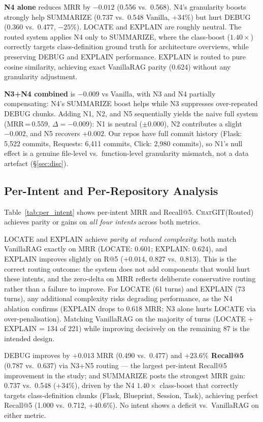 \documentclass[runningheads]{llncs}
\newcommand{\chatgit}{\textsc{ChatGIT}\xspace}
\begin{document}
\textbf{N4 alone} reduces MRR by $-0.012$ (0.556 vs.\ 0.568).
N4's granularity boosts strongly help SUMMARIZE (0.737 vs.\ 0.548 Vanilla,
$+34\%$) but hurt DEBUG (0.360 vs.\ 0.477, $-25\%$). LOCATE and
EXPLAIN are roughly neutral. The routed system applies N4 only to
SUMMARIZE, where the class-boost ($1.40\times$) correctly targets
class-definition ground truth for architecture overviews, while
preserving DEBUG and EXPLAIN performance.
EXPLAIN is routed to pure cosine similarity, achieving exact
VanillaRAG parity (0.624) without any granularity adjustment.

\textbf{N3+N4 combined} is $-0.009$ vs Vanilla, with N3 and N4
partially compensating: N4's SUMMARIZE boost helps while N3
suppresses over-repeated DEBUG chunks. Adding N1, N2,
and N5 sequentially yields the naive full system (MRR\,=\,0.559,
$\Delta{=}{-}0.009$): N1 is neutral ($\pm$0.000), N2 contributes
a slight $-0.002$, and N5 recovers $+0.002$. Our repos have full commit
history (Flask: 5,522 commits, Requests: 6,411 commits,
Click: 2,980 commits), so N1's null
effect is a genuine file-level vs.\ function-level granularity
mismatch, not a data artefact (\S\ref{sec:disc}).

\subsection{Per-Intent and Per-Repository Analysis}

Table~\ref{tab:per_intent} shows per-intent MRR and Recall@5.
\chatgit (Routed) achieves parity or gains on \emph{all four
intents} across both metrics.

LOCATE and EXPLAIN achieve \emph{parity at reduced complexity}:
both match VanillaRAG exactly on MRR (LOCATE: 0.601; EXPLAIN: 0.624),
and EXPLAIN improves slightly on R@5 ($+0.014$, 0.827 vs.\ 0.813).
This is the correct routing outcome: the system does not add
components that would hurt these intents, and the zero-delta on MRR
reflects deliberate conservative routing rather than a failure to
improve. For LOCATE (61 turns) and EXPLAIN (73 turns), any
additional complexity risks degrading performance, as the N4 ablation
confirms (EXPLAIN drops to 0.618 MRR; N3 alone hurts LOCATE via
over-penalisation). Matching VanillaRAG on the majority of turns
(LOCATE + EXPLAIN = 134 of 221) while improving decisively on the
remaining 87 is the intended design.

DEBUG improves by $+0.013$ MRR (0.490 vs.\ 0.477) and
\textbf{$+23.6\%$ Recall@5} (0.787 vs.\ 0.637) via N3+N5
routing --- the largest per-intent Recall@5 improvement in the
study; and SUMMARIZE posts the strongest MRR gain: 0.737 vs.\ 0.548
($+34\%$), driven by the N4 $1.40\times$ class-boost that correctly
targets class-definition chunks (Flask, Blueprint, Session, Task),
achieving perfect Recall@5 (1.000 vs.\ 0.712, $+40.6\%$).
No intent shows a deficit vs.\ VanillaRAG on either metric.
\end{document}

